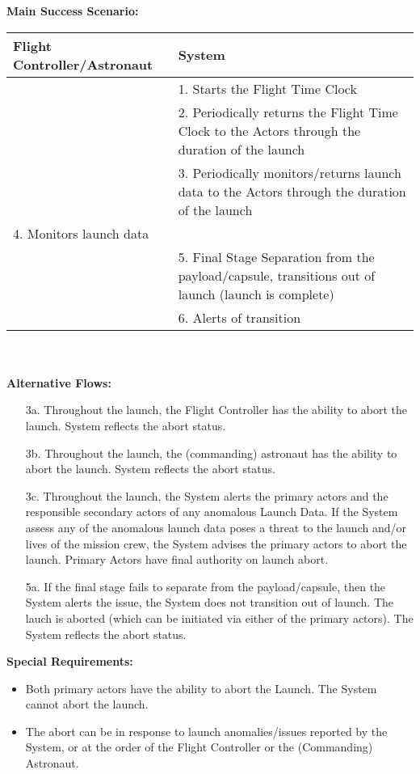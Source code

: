 \documentclass[letterpaper]{article}
\begin{document}
\textbf{Main Success Scenario:  }\\
\begin{tabular}{|p{5.75cm}|p{5.75cm}|}\hline
\textbf{Flight Controller/Astronaut}&\textbf{System}\\\hline
&1. Starts the Flight Time Clock\\\hline
&2. Periodically returns the Flight Time Clock to the Actors through
the duration of the launch\\\hline
&3. Periodically monitors/returns launch data to the Actors through
the duration of the launch\\\hline
4.  Monitors launch data &\\\hline
&5. Final Stage Separation from the payload/capsule, transitions out
of launch (launch is complete)\\\hline
&6. Alerts of transition\\\hline
\end{tabular}\\\\
\textbf{Alternative Flows:}
\begin{itemize}
\item[3a.]Throughout the launch, the Flight Controller has the 
ability to abort the launch.  System reflects the abort status.
\item[3b.]Throughout the launch, the (commanding) astronaut has
the ability to abort the launch.  System reflects the abort status.
\item[3c.]Throughout the launch, the System alerts the primary actors
and the responsible secondary actors of any anomalous Launch Data.
If the System assess any of the anomalous launch data poses a threat
to the launch and/or lives of the mission crew, the System advises the
primary actors to abort the launch.  Primary Actors have final
authority on launch abort.
\item[5a.]If the final stage fails to separate from the
payload/capsule, then the System alerts the issue, the System does not
transition out of launch.  The lauch is aborted
(which can be initiated via either of the primary actors).  The
System reflects the abort status.
\end{itemize}
\textbf{Special Requirements:}
\begin{itemize}
\item Both primary actors have the ability to abort the Launch. The
System cannot abort the launch.
\item The abort can be in response to launch anomalies/issues
reported by the System, or at the order of the Flight Controller or
the (Commanding) Astronaut.
\end{itemize}
\end{document}

